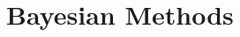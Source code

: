 \documentclass[c, dvipsnames]{beamer}  %
\begin{document}
\section{Bayesian Methods}
%
%
%
%
%
%
%
%  
%
%
%  
%
%  
%
%
%
%
%
%
%
%
%
%
%	
%
%
%
%
%
%
%
%
%
\end{document}
